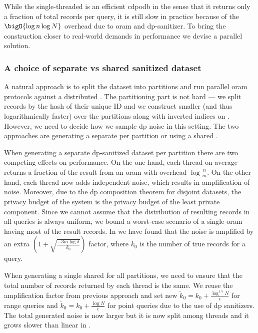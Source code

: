			While the single-threaded \epsolute{} is an efficient \acrshort{cdpodb} in the sense that it returns only a fraction of total records per query, it is still slow in practice because of the $\bigO{\log \dataSize \log \domainSize}$ overhead due to \acrshort{oram} and \acrshort{dp}-sanitizer.
			To bring the construction closer to real-world demands in performance we devise a parallel solution.

			\subsubsection{A choice of separate vs shared sanitized dataset}

				A natural approach is to split the dataset \database{} into \oramsNumber{} partitions and run parallel \acrshort{oram} protocols against a distributed \server{}.
				The partitioning part is not hard --- we split records by the hash of their unique ID and we construct smaller (and thus logarithmically faster)  over the partitions along with \oramsNumber{} inverted indices on \user{}.
				However, we need to decide how we sample \acrshort{dp} noise in this setting.
				The two approaches are generating a separate \serverDS{} per partition or using a shared \serverDS{}.

				When generating a separate \acrshort{dp}-sanitized dataset \serverDS{} per partition there are two competing effects on performance.
				On the one hand, each thread on average returns a  fraction of the result from an \acrshort{oram} with overhead $\log \frac{n}{m}$.
				On the other hand, each thread now adds independent noise, which results in \oramsNumber{} amplification of noise.
				Moreover, due to the \acrshort{dp} composition theorem \cite{privacy-integrated-queries,differential-privacy-original,our-data-ourselves} for disjoint datasets, the privacy budget of the system is the privacy budget of the least private component.
				Since we cannot assume that the distribution of resulting records in all queries is always uniform, we bound a worst-case scenario of a single \acrshort{oram} having most of the result records.
				In \cite[Section 5.1]{epsolute} we have found that the noise is amplified by an extra $\left( 1 + \sqrt{ \frac{-3 m \log \delta}{k_0} } \right)$ factor, where $k_0$ is the number of true records for a query.

				When generating a single shared \serverDS{} for all \oramsNumber{} partitions, we need to ensure that the total number of records returned by each thread is the same.
				We reuse the amplification factor from previous approach and set new $\tilde{k}_0 = k_0 + \frac{\log^{1.5} N}{\epsilon}$ for range queries and $\tilde{k}_0 = k_0 + \frac{\log N}{\epsilon}$ for point queries due to the use of \acrshort{dp} sanitizers.
				The total generated noise is now larger but it is now split among \oramsNumber{} threads and it grows slower than linear in \oramsNumber{}.

